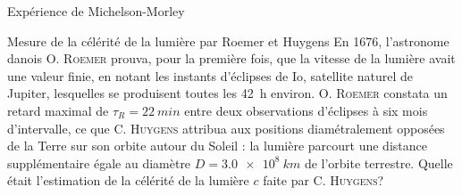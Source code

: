 \begin{exo}[PC][2][colle]{Expérience de Michelson-Morley}
\begin{quest}
  \end{quest}
  
\end{exo}

\begin{exo}[PC][1][colle]{Mesure de la célérité de la lumière par Roemer et Huygens}
En 1676, l'astronome danois O. \textsc{Roemer} prouva, pour la première fois, que la vitesse de la lumière avait une valeur finie, en notant les instants d'éclipses de Io, satellite naturel de Jupiter, lesquelles se produisent toutes les \SI{42}{h} environ.
O. \textsc{Roemer} constata un retard maximal de $\tau_R = \SI{22}{min}$ entre deux observations d'éclipses à six mois d'intervalle, ce que C. \textsc{Huygens} attribua aux positions diamétralement opposées de la Terre sur son orbite autour du Soleil : la lumière parcourt une distance supplémentaire égale au diamètre $D=\SI{3,0e8}{km}$ de l'orbite terrestre. Quelle était l'estimation de la célérité de la lumière $c$ faite par C. \textsc{Huygens}?



\end{exo}


